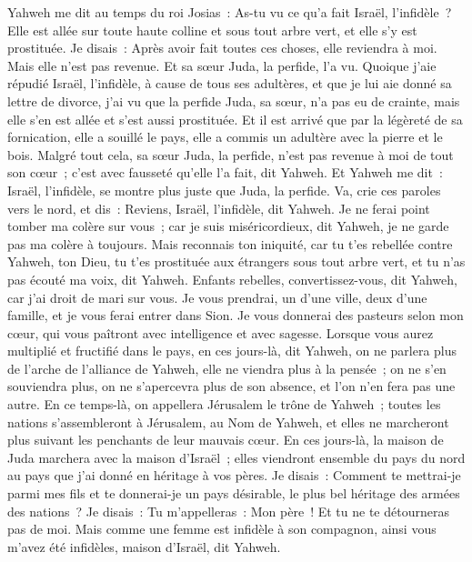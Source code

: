 \begin{multicols}{2}
Yahweh me dit au temps du roi Josias~: As-tu vu ce qu'a fait Israël, l'infidèle~? Elle est allée sur toute haute colline et sous tout arbre vert, et elle s'y est prostituée.
Je disais~: Après avoir fait toutes ces choses, elle reviendra à moi. Mais elle n'est pas revenue. Et sa sœur Juda, la perfide, l'a vu.
Quoique j'aie répudié Israël, l'infidèle, à cause de tous ses adultères, et que je lui aie donné sa lettre de divorce, j'ai vu que la perfide Juda, sa sœur, n'a pas eu de crainte, mais elle s'en est allée et s'est aussi prostituée.
Et il est arrivé que par la légèreté de sa fornication, elle a souillé le pays, elle a commis un adultère avec la pierre et le bois.
Malgré tout cela, sa sœur Juda, la perfide, n'est pas revenue à moi de tout son cœur~; c'est avec fausseté qu'elle l'a fait, dit Yahweh.
Et Yahweh me dit~: Israël, l'infidèle, se montre plus juste que Juda, la perfide.
Va, crie ces paroles vers le nord, et dis~: Reviens, Israël, l'infidèle, dit Yahweh. Je ne ferai point tomber ma colère sur vous~; car je suis miséricordieux, dit Yahweh, je ne garde pas ma colère à toujours.
Mais reconnais ton iniquité, car tu t'es rebellée contre Yahweh, ton Dieu, tu t'es prostituée aux étrangers sous tout arbre vert, et tu n'as pas écouté ma voix, dit Yahweh.
Enfants rebelles, convertissez-vous, dit Yahweh, car j'ai droit de mari sur vous. Je vous prendrai, un d'une ville, deux d'une famille, et je vous ferai entrer dans Sion.
Je vous donnerai des pasteurs selon mon cœur, qui vous paîtront avec intelligence et avec sagesse.
Lorsque vous aurez multiplié et fructifié dans le pays, en ces jours-là, dit Yahweh, on ne parlera plus de l'arche de l'alliance de Yahweh, elle ne viendra plus à la pensée~; on ne s'en souviendra plus, on ne s'apercevra plus de son absence, et l'on n'en fera pas une autre.
En ce temps-là, on appellera Jérusalem le trône de Yahweh~; toutes les nations s'assembleront à Jérusalem, au Nom de Yahweh, et elles ne marcheront plus suivant les penchants de leur mauvais cœur.
En ces jours-là, la maison de Juda marchera avec la maison d'Israël~; elles viendront ensemble du pays du nord au pays que j'ai donné en héritage à vos pères.
Je disais~: Comment te mettrai-je parmi mes fils et te donnerai-je un pays désirable, le plus bel héritage des armées des nations~? Je disais~: Tu m'appelleras~: Mon père~! Et tu ne te détourneras pas de moi.
Mais comme une femme est infidèle à son compagnon, ainsi vous m'avez été infidèles, maison d'Israël, dit Yahweh.

\end{multicols}
